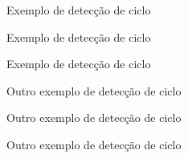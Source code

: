 \begin{frame}[fragile]{Exemplo de detecção de ciclo}
\end{frame}

\begin{frame}[fragile]{Exemplo de detecção de ciclo}
\end{frame}

\begin{frame}[fragile]{Exemplo de detecção de ciclo}
\end{frame}

\begin{frame}[fragile]{Outro exemplo de detecção de ciclo}
\end{frame}

\begin{frame}[fragile]{Outro exemplo de detecção de ciclo}
\end{frame}

\begin{frame}[fragile]{Outro exemplo de detecção de ciclo}
\end{frame}
